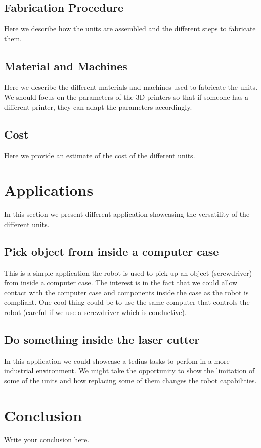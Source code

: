 \documentclass[12pt]{article}
\begin{document}
\subsection{Fabrication Procedure}
Here we describe how the units are assembled and the different steps to fabricate them.

\subsection{Material and Machines}
Here we describe the different materials and machines used to fabricate the units.
We should focus on the parameters of the 3D printers so that if someone has a different printer, they can adapt the parameters accordingly.

\subsection{Cost}
Here we provide an estimate of the cost of the different units.

\section{Applications}
In this section we present different application showcasing the versatility of the different units.

\subsection{Pick object from inside a computer case}
This is a simple application the robot is used to pick up an object (screwdriver) from inside a computer case.
The interest is in the fact that we could allow contact with the computer case and components inside the case as the robot is compliant.
One cool thing could be to use the same computer that controls the robot (careful if we use a screwdriver which is conductive).

\subsection{Do something inside the laser cutter}
In this application we could showcase a tedius tasks to perfom in a more industrial environment.
We might take the opportunity to show the limitation of some of the units and how replacing some of them changes the robot capabilities.




\section{Conclusion}
Write your conclusion here.
\end{document}

